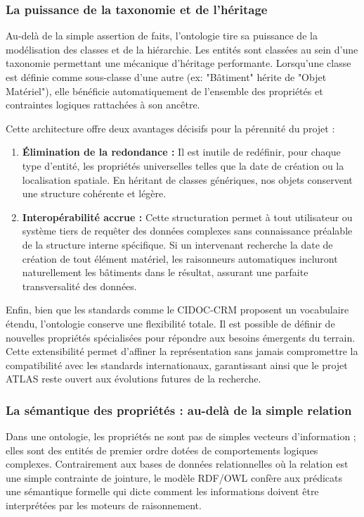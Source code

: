 \documentclass{article}
\begin{document}
\subsubsection{La puissance de la taxonomie et de l'héritage}
Au-delà de la simple assertion de faits, l'ontologie tire sa puissance de la modélisation des classes et de la hiérarchie. Les entités sont classées au sein d'une taxonomie permettant une mécanique d'héritage performante. Lorsqu'une classe est définie comme sous-classe d'une autre (ex: "Bâtiment" hérite de "Objet Matériel"), elle bénéficie automatiquement de l'ensemble des propriétés et contraintes logiques rattachées à son ancêtre.

Cette architecture offre deux avantages décisifs pour la pérennité du projet :
\begin{enumerate}
    \item \textbf{Élimination de la redondance :} Il est inutile de redéfinir, pour chaque type d'entité, les propriétés universelles telles que la date de création ou la localisation spatiale. En héritant de classes génériques, nos objets conservent une structure cohérente et légère.
    \item \textbf{Interopérabilité accrue :} Cette structuration permet à tout utilisateur ou système tiers de requêter des données complexes sans connaissance préalable de la structure interne spécifique. Si un intervenant recherche la date de création de tout élément matériel, les raisonneurs automatiques incluront naturellement les bâtiments dans le résultat, assurant une parfaite transversalité des données.
\end{enumerate}

Enfin, bien que les standards comme le CIDOC-CRM proposent un vocabulaire étendu, l'ontologie conserve une flexibilité totale. Il est possible de définir de nouvelles propriétés spécialisées pour répondre aux besoins émergents du terrain. Cette extensibilité permet d'affiner la représentation sans jamais compromettre la compatibilité avec les standards internationaux, garantissant ainsi que le projet ATLAS reste ouvert aux évolutions futures de la recherche.
\subsubsection{La sémantique des propriétés : au-delà de la simple relation}

Dans une ontologie, les propriétés ne sont pas de simples vecteurs d'information ; elles sont des entités de premier ordre dotées de comportements logiques complexes. Contrairement aux bases de données relationnelles où la relation est une simple contrainte de jointure, le modèle RDF/OWL confère aux prédicats une sémantique formelle qui dicte comment les informations doivent être interprétées par les moteurs de raisonnement.
\end{document}
